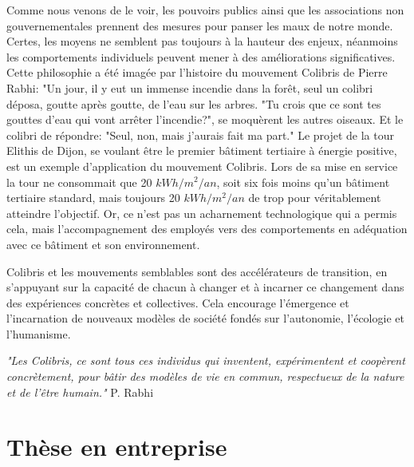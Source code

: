 Comme nous venons de le voir, les pouvoirs publics ainsi que les associations non gouvernementales prennent des mesures pour panser les maux de notre monde. Certes, les moyens ne semblent pas toujours à la hauteur des enjeux, néanmoins les comportements individuels peuvent mener à des améliorations significatives. Cette philosophie a été imagée par l'histoire du mouvement Colibris de Pierre Rabhi: "Un jour, il y eut un immense incendie dans la forêt, seul un colibri déposa, goutte après goutte, de l'eau sur les arbres. "Tu crois que ce sont tes gouttes d'eau qui vont arrêter l'incendie?", se moquèrent les autres oiseaux. Et le colibri de répondre: "Seul, non, mais j'aurais fait ma part." Le projet de la tour Elithis de Dijon, se voulant être le premier bâtiment tertiaire à énergie positive, est un exemple d'application du mouvement Colibris. Lors de sa mise en service la tour ne consommait que 20 $kWh/m^2/an$, soit six fois moins qu'un bâtiment tertiaire standard, mais toujours 20 $kWh/m^2/an$ de trop pour véritablement atteindre l'objectif. Or, ce n'est pas un acharnement technologique qui a permis cela, mais l'accompagnement des employés vers des comportements en adéquation avec ce bâtiment et son environnement.

Colibris et les mouvements semblables sont des accélérateurs de transition, en s'appuyant sur la capacité de chacun à changer et à incarner ce changement dans des expériences concrètes et collectives. Cela encourage l'émergence et l'incarnation de nouveaux modèles de société fondés sur l'autonomie, l'écologie et l'humanisme.

\textit{"Les Colibris, ce sont tous ces individus qui inventent, expérimentent et coopèrent concrètement, pour bâtir des modèles de vie en commun, respectueux de la nature et de l'être humain."} P. Rabhi

\section*{Thèse en entreprise}

